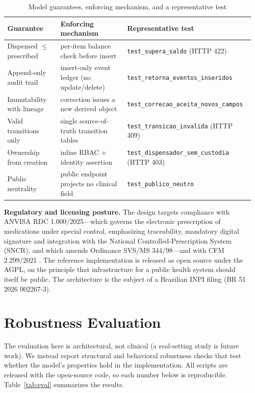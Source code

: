 \documentclass[conference]{IEEEtran}
\begin{document}
\begin{table}[t]
\caption{Model guarantees, enforcing mechanism, and a representative test}
\label{tab:guarantees}
\centering
\footnotesize
\renewcommand{\arraystretch}{1.25}
\begin{tabular}{|p{2.1cm}|p{2.7cm}|p{2.5cm}|}
\hline
\textbf{Guarantee} & \textbf{Enforcing mechanism} & \textbf{Representative test} \\
\hline
Dispensed $\leq$ prescribed & per-item balance check before insert & \texttt{test\_supera\_saldo} (HTTP 422) \\
\hline
Append-only audit trail & insert-only event ledger (no update/delete) & \texttt{test\_retorna\_\allowbreak eventos\_inseridos} \\
\hline
Immutability with lineage & correction issues a new derived object & \texttt{test\_correcao\_\allowbreak aceita\_novos\_campos} \\
\hline
Valid transitions only & single source-of-truth transition tables & \texttt{test\_transicao\_\allowbreak invalida} (HTTP 409) \\
\hline
Ownership from creation & inline RBAC + identity assertion & \texttt{test\_dispensador\_\allowbreak sem\_custodia} (HTTP 403) \\
\hline
Public neutrality & public endpoint projects no clinical field & \texttt{test\_publico\_\allowbreak neutro} \\
\hline
\end{tabular}
\end{table}

\textbf{Regulatory and licensing posture.} The design targets compliance with ANVISA RDC 1.000/2025---which governs the electronic prescription of medications under special control, emphasizing traceability, mandatory digital signature and integration with the National Controlled-Prescription System (SNCR), and which amends Ordinance SVS/MS 344/98---and with CFM 2.299/2021 \cite{cfm,rdc}. The reference implementation is released as open source under the AGPL, on the principle that infrastructure for a public health system should itself be public. The architecture is the subject of a Brazilian INPI filing (BR 51 2026 002267-3).

\section{Robustness Evaluation}\label{sec:eval}
The evaluation here is architectural, not clinical (a real-setting study is future work). We instead report structural and behavioral robustness checks that test whether the model's properties hold in the implementation. All scripts are released with the open-source code, so each number below is reproducible. Table~\ref{tab:eval} summarizes the results.
\end{document}
